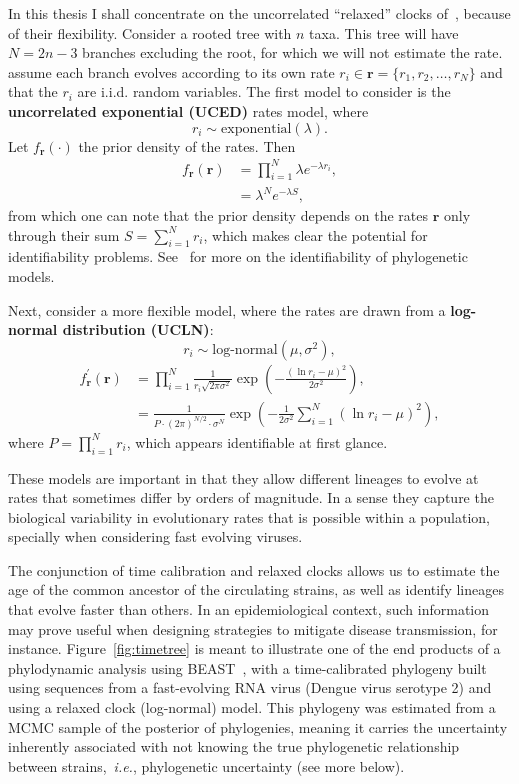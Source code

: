 In this thesis I shall concentrate on the uncorrelated ``relaxed'' clocks of~\cite{Drummond2006}, because of their flexibility.
Consider a rooted tree with $n$ taxa. 
This tree will have $N = 2n-3$ branches excluding the root, for which we will not estimate the rate.
\cite{Drummond2006} assume each branch evolves according to its own rate $r_i \in \mathbf{r} =\{r_1, r_2, \ldots, r_{N}\}$ and that the $r_i$ are i.i.d. random variables.
The first model to consider is the \textbf{uncorrelated exponential (UCED)} rates model, where
\[r_i \sim \text{exponential}(\lambda).\]
Let $f_{\mathbf{r}}(\cdot)$ the prior density of the rates.
Then
\begin{align}
 f_{\mathbf{r}}(\mathbf{r}) &= \prod_{i=1}^{N}\lambda e^{-\lambda r_i}, \\
 &= \lambda^{N} e^{-\lambda S},
\end{align}
from which one can note that the prior density depends on the rates $\mathbf{r}$ only through their sum $S = \sum_{i=1}^{N} r_i$, which makes clear the potential for identifiability problems.
See~\cite{Rannala2002} for more on the identifiability of phylogenetic models.

Next, consider a more flexible model, where the rates are drawn from a \textbf{log-normal distribution (UCLN)}:
\[r_i \sim \text{log-normal}(\mu, \sigma^2),\]
\begin{align}
 f_{\mathbf{r}}^{\prime}(\mathbf{r}) &= \prod_{i=1}^{N} \frac{1}{r_i\sqrt{2\pi\sigma^2}} \exp\left(-\frac{(\ln r_i- \mu)^2}{2\sigma^2} \right), \\
 &= \frac{1}{P \cdot (2\pi)^{N/2} \cdot \sigma^{N}} \exp\left(-\frac{1}{2\sigma^2}\sum_{i=1}^{N}(\ln r_i- \mu)^2 \right),
 \end{align}
where $P = \prod_{i=1}^{N} r_i$, which appears identifiable at first glance.

These models are important in that they allow different lineages to evolve at rates that sometimes differ by orders of magnitude.
In a sense they capture the biological variability in evolutionary rates that is possible within a population, specially when considering fast evolving viruses.

The conjunction of time calibration and relaxed clocks allows us to estimate the age of the common ancestor of the circulating strains, as well as identify lineages that evolve faster than others.
In an epidemiological context, such information may prove useful when designing strategies to mitigate disease transmission, for instance.
Figure~\ref{fig:timetree} is meant to illustrate one of the end products of a phylodynamic analysis using BEAST~\citep{Drummond2007,Drummond2012}, with a time-calibrated phylogeny built using sequences from a fast-evolving RNA virus (Dengue virus serotype 2) and using a relaxed clock (log-normal) model.
This phylogeny was estimated from a MCMC sample of the posterior of phylogenies, meaning it carries the uncertainty inherently associated with not knowing the true phylogenetic relationship between strains,~\textit{i.e.}, phylogenetic uncertainty (see more below).

